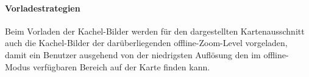 
\paragraph{Vorladestrategien}
Beim Vorladen der Kachel-Bilder werden für den dargestellten Kartenausschnitt auch die Kachel-Bilder der darüberliegenden offline-Zoom-Level vorgeladen, damit ein Benutzer ausgehend von der niedrigsten Auflösung
den im offline-Modus verfügbaren Bereich auf der Karte finden kann.
\enlargethispage{2\baselineskip} %
